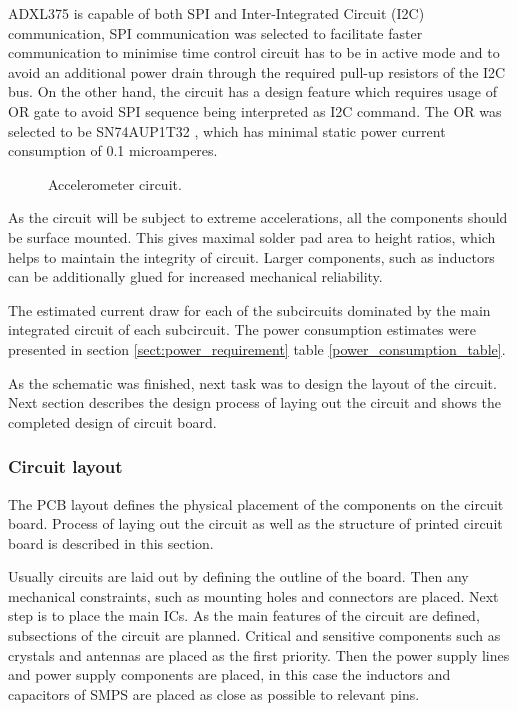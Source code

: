 ADXL375 is capable of both SPI and Inter-Integrated Circuit (I2C) communication, SPI communication was selected to facilitate faster communication to minimise time control circuit has to be in active mode and to avoid an additional power drain through the required pull-up resistors of the I2C bus. On the other hand, the circuit has a design feature which requires usage of OR gate to avoid SPI sequence being interpreted as I2C command. The OR was selected to be SN74AUP1T32 \cite{orgate}, which has minimal static power current consumption of 0.1 microamperes. 

\begin{figure}[htb]
    \centering
    \def\svgwidth{\columnwidth}
    
    \caption{\label{fig:sensor_circuit} Accelerometer circuit.}
\end{figure}

As the circuit will be subject to extreme accelerations, all the components should be surface mounted. This gives maximal solder pad area to height ratios, which helps to maintain the integrity of circuit. Larger components, such as inductors can be additionally glued for increased mechanical reliability.

The estimated current draw for each of the subcircuits dominated by the main integrated circuit of each subcircuit. The power consumption estimates were presented in section \ref{sect:power_requirement} table \ref{power_consumption_table}.

As the schematic was finished, next task was to design the layout of the circuit. Next section describes the design process of laying out the circuit and shows the completed design of circuit board.

\subsubsection{Circuit layout}
The PCB layout defines the physical placement of the components on the circuit board. Process of laying out the circuit as well as the structure of printed circuit board is described in this section.

Usually circuits are laid out by defining the outline of the board. Then any mechanical constraints, such as mounting holes and connectors are placed. Next step is to place the main ICs. As the main features of the circuit are defined, subsections of the circuit are planned. Critical and sensitive components such as crystals and antennas are placed as the first priority. Then the power supply lines and power supply components are placed, in this case the inductors and capacitors of SMPS are placed as close as possible to relevant pins. 

